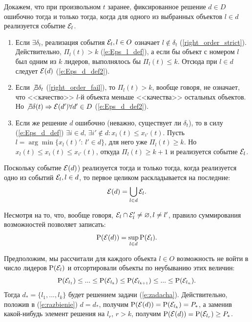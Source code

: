 Докажем, что при произвольном $t$ заранее, фиксированное решение $d \in D$ ошибочно тогда и только тогда, когда для одного из выбранных объектов $l \in d$ реализуется событие $\mathcal{E}_l$.
\begin{enumerate}
  \item Если $\exists \delta_t$, реализация события $\mathcal{E}_l, l \in O$ означает $l \notin \delta_t$ (\ref{right_order_strict}). Действительно, $\Pi_l(t) > k$ (\ref{e:Eps_l_def}), а если бы объект с номером $l$ был одним из $k$ лидеров, выполнялось бы $\Pi_l(t) \leq k$. Отсюда при $l \in d$ следует $\mathcal{E}(d)$ (\ref{e:Eps_d_def2}).
  \item Если $\not\exists \delta_t$ (\ref{right_order_fail}), то $\Pi_l(t) > k$, вообще говоря, не означает, что <<качество>> $l$-й объекта меньше <<качества>> остальных объектов. Но $\not\exists \delta(t) \Rightarrow \mathcal{E}(d') \forall d' \in D$ (\ref{e:Eps_d_def2}).
  \item Если же решение $d$ ошибочно (неважно, существует ли $\delta_t$), то в силу (\ref{e:Eps_d_def}) $\exists i \in d,\, \exists i' \notin d: x_i(t) \leq x_{i'}(t)$. %
  Пусть $l = \arg\min \{x_l(t)':\,l' \in d\}$, для него уже $\Pi_l(t) \geq k$. Но $x_l(t) \leq x_i(t) \leq x_{i'}(t)$, откуда $\Pi_l(t) \geq k+1$ и реализуется событие $\mathcal{E}_l$.     
\end{enumerate}

Поскольку событие $\mathcal{E}(d)$) реализуется тогда и только тогда, когда реализуется одно из событий $\mathcal{E}_l, l \in d$, то первое целиком раскладывается на последние:
\begin{equation*}
  \mathcal{E}(d) = \bigcup_{l \in d} \mathcal{E}_l.
\end{equation*}

Несмотря на то, что, вообще говоря, $\mathcal{E}_l \cap \mathcal{E}_l' \neq \varnothing, l \neq l'$, правило суммирования возможностей позволяет записать:
\begin{equation}
  \label{e:razbienie}
  {\mathrm{P}}(\mathcal{E}(d)) = \sup_{l \in d} {\mathrm{P}}(\mathcal{E}_l).
\end{equation}

Предположим, мы рассчитали для каждого объекта $l \in O$ возможность не войти в число лидеров ${\mathrm{P}}(\mathcal{E}_l)$ и отсортировали объекты по неубыванию этих величин:
\begin{equation}
  \label{e:left_order}
  {\mathrm{P}}(\mathcal{E}_{l_1}) \leq ... \leq {\mathrm{P}}(\mathcal{E}_{l_k}) \leq {\mathrm{P}}(\mathcal{E}_{l_{k+1}}) \leq ... \leq {\mathrm{P}}(\mathcal{E}_{l_n}). 
\end{equation}
Тогда $d_* = \{l_1, ...,  l_k\}$ будет решением задачи (\ref{e:zadacha}). Действительно, положив в (\ref{e:razbienie}) $d = d_*$, получим ${\mathrm{P}}(\mathcal{E}(d)) = {\mathrm{P}}(\mathcal{E}_{l_k}) = P_*$, а заменив какой-нибудь элемент  решения на $l_r$, $r > k$, получим ${\mathrm{P}}(\mathcal{E}(d)) = {\mathrm{P}}(\mathcal{E}_{l_r}) \geq P_*$. 

